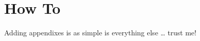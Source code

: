 \chapter{How To}
    \label{app:how_to}
    
    Adding appendixes is as simple is everything else \ldots{} trust me!
